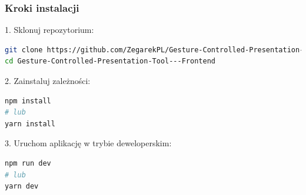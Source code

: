 \documentclass[12pt,a4paper]{article}
\begin{document}
\subsubsection{Kroki instalacji}
1. Sklonuj repozytorium:
\begin{lstlisting}[language=bash]
git clone https://github.com/ZegarekPL/Gesture-Controlled-Presentation-Tool---Frontend.git
cd Gesture-Controlled-Presentation-Tool---Frontend
\end{lstlisting}

2. Zainstaluj zależności:
\begin{lstlisting}[language=bash]
npm install
# lub
yarn install
\end{lstlisting}

3. Uruchom aplikację w trybie deweloperskim:
\begin{lstlisting}[language=bash]
npm run dev
# lub
yarn dev
\end{lstlisting}
\end{document}
